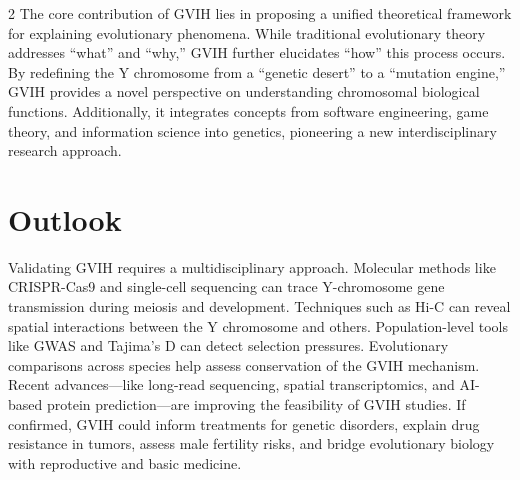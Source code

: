 \documentclass{base}
\begin{document}
\begin{multicols}{2}
The core contribution of GVIH lies in proposing a unified theoretical framework for explaining evolutionary phenomena. While traditional evolutionary theory addresses ``what'' and ``why,'' GVIH further elucidates ``how'' this process occurs. By redefining the Y chromosome from a ``genetic desert'' to a ``mutation engine,'' GVIH provides a novel perspective on understanding chromosomal biological functions. Additionally, it integrates concepts from software engineering, game theory, and information science into genetics, pioneering a new interdisciplinary research approach.

\section{Outlook}
Validating GVIH requires a multidisciplinary approach. Molecular methods like CRISPR-Cas9 and single-cell sequencing can trace Y-chromosome gene transmission during meiosis and development. Techniques such as Hi-C can reveal spatial interactions between the Y chromosome and others. Population-level tools like GWAS and Tajima's D can detect selection pressures. Evolutionary comparisons across species help assess conservation of the GVIH mechanism. Recent advances---like long-read sequencing, spatial transcriptomics, and AI-based protein prediction---are improving the feasibility of GVIH studies. If confirmed, GVIH could inform treatments for genetic disorders, explain drug resistance in tumors, assess male fertility risks, and bridge evolutionary biology with reproductive and basic medicine.



\printbibliography
\end{multicols}

\end{document}
